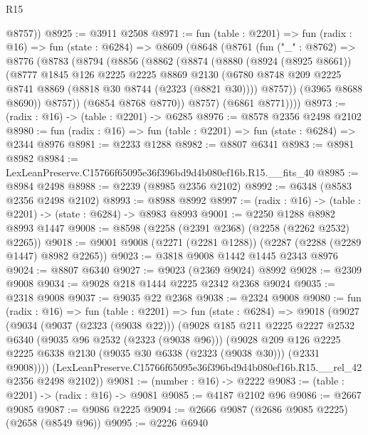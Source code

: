 \begin{lexlean}{R15}
\begin{coremodule}
        @8757))
@8925 := @3911 @2508
@8971 := fun (table : @2201) =>
  fun (radix : @16) =>
  fun (state : @6284) =>
  @8609
    (@8648
      (@8761
        (fun ("_" : @8762) =>
        @8776
          (@8783
            (@8794
              (@8856
                (@8862
                  (@8874
                    (@8880
                      (@8924 (@8925 @8661))
                      (@8777
                        @1845
                        @126
                        @2225
                        @2225
                        @8869
                        @2130
                        (@6780 @8748 @209 @2225 @8741 @8869 (@8818 @30 @8744 (@2323 (@8821 @30))))
                        @8757))
                    (@3965 @8688 @8690))
                  @8757))
              (@6854 @8768 @8770))
            @8757)
          (@6861 @8771))))
@8973 := (radix : @16) -> (table : @2201) -> @6285
@8976 := @8578 @2356 @2498 @2102
@8980 := fun (radix : @16) => fun (table : @2201) => fun (state : @6284) => @2344 @8976
@8981 := @2233 @1288
@8982 := @8807 @6341
@8983 := @8981 @8982
@8984 := LexLeanPreserve.C15766f65095e36f396bd9d4b080ef16b.R15.__fits_40
@8985 := @8984 @2498
@8988 := @2239 (@8985 @2356 @2102)
@8992 := @6348 (@8583 @2356 @2498 @2102)
@8993 := @8988 @8992
@8997 := (radix : @16) -> (table : @2201) -> (state : @6284) -> @8983 @8993
@9001 := @2250 @1288 @8982 @8993 @1447
@9008 := @8598 (@2258 (@2391 @2368) (@2258 (@2262 @2532) @2265))
@9018 := @9001 @9008 (@2271 (@2281 @1288)) (@2287 (@2288 (@2289 @1447) @8982 @2265))
@9023 := @3818 @9008 @1442 @1445 @2343 @8976
@9024 := @8807 @6340
@9027 := @9023 (@2369 @9024) @8992
@9028 := @2309 @9008
@9034 := @9028 @218 @1444 @2225 @2342 @2368 @9024
@9035 := @2318 @9008
@9037 := @9035 @22 @2368
@9038 := @2324 @9008
@9080 := fun (radix : @16) =>
  fun (table : @2201) =>
  fun (state : @6284) =>
  @9018
    (@9027
      (@9034
        (@9037 (@2323 (@9038 @22)))
        (@9028
          @185
          @211
          @2225
          @2227
          @2532
          @6340
          (@9035 @96 @2532 (@2323 (@9038 @96)))
          (@9028
            @209
            @126
            @2225
            @2225
            @6338
            @2130
            (@9035 @30 @6338 (@2323 (@9038 @30)))
            (@2331 @9008))))
      (LexLeanPreserve.C15766f65095e36f396bd9d4b080ef16b.R15.__rel_42 @2356 @2498 @2102))
@9081 := (number : @16) -> @2222
@9083 := (table : @2201) -> (radix : @16) -> @9081
@9085 := @4187 @2102 @96
@9086 := @2667 @9085
@9087 := @9086 @2225
@9094 := @2666 @9087 (@2686 @9085 @2225) (@2658 (@8549 @96))
@9095 := @2226 @6940

\end{coremodule}
\end{lexlean}

